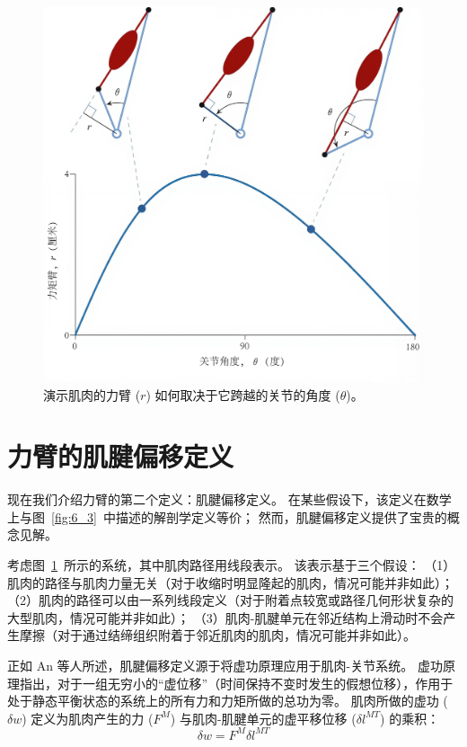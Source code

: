 \begin{figure}[!htb]
	\centering
	\includegraphics[width=0.8\linewidth]{chap6/6_4}
	\caption{演示肌肉的力臂 ($r$) 如何取决于它跨越的关节的角度 ($\theta$)。 \label{fig:6_4}}
\end{figure}


\section{力臂的肌腱偏移定义}

现在我们介绍力臂的第二个定义：肌腱偏移定义。
在某些假设下，该定义在数学上与图~\ref{fig:6_3}~中描述的解剖学定义等价；
然而，肌腱偏移定义提供了宝贵的概念见解。


考虑图~\ref{fig:6_4}~所示的系统，其中肌肉路径用线段表示。
该表示基于三个假设：
（1）肌肉的路径与肌肉力量无关（对于收缩时明显隆起的肌肉，情况可能并非如此）；
（2）肌肉的路径可以由一系列线段定义（对于附着点较宽或路径几何形状复杂的大型肌肉，情况可能并非如此）；
（3）肌肉-肌腱单元在邻近结构上滑动时不会产生摩擦（对于通过结缔组织附着于邻近肌肉的肌肉，情况可能并非如此）。


正如 An 等人\cite{an1984determination}所述，肌腱偏移定义源于将虚功原理应用于肌肉-关节系统。
虚功原理指出，对于一组无穷小的“虚位移”（时间保持不变时发生的假想位移），作用于处于静态平衡状态的系统上的所有力和力矩所做的总功为零。
肌肉所做的虚功 ($\delta w$) 定义为肌肉产生的力 ($F^M$) 与肌肉-肌腱单元的虚平移位移 ($\delta l^{MT}$) 的乘积：
%
\begin{equation}
	\delta w = F^M \delta l^{MT}
	\label{eq:6_6}
\end{equation}


